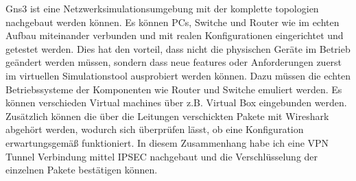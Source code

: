 \documentclass[english,runningheads,a4paper]{llncs}[2018/03/10]
\begin{document}
Gns3 ist eine Netzwerksimulationsumgebung mit der komplette topologien nachgebaut werden können. Es können PCs, Switche und Router wie im echten Aufbau miteinander verbunden und mit realen Konfigurationen eingerichtet und getestet werden. Dies hat den vorteil, dass nicht die physischen Geräte im Betrieb geändert werden müssen, sondern dass neue features oder Anforderungen zuerst im virtuellen Simulationstool ausprobiert werden können. Dazu müssen die echten Betriebssysteme der Komponenten wie Router und Switche emuliert werden. Es können verschieden Virtual machines über z.B. Virtual Box eingebunden werden. Zusätzlich können die über die Leitungen verschickten Pakete mit Wireshark abgehört werden, wodurch sich überprüfen lässt, ob eine Konfiguration erwartungsgemäß funktioniert. In diesem Zusammenhang habe ich eine VPN Tunnel Verbindung mittel IPSEC nachgebaut und die Verschlüsselung der einzelnen Pakete bestätigen können.
\end{document}
